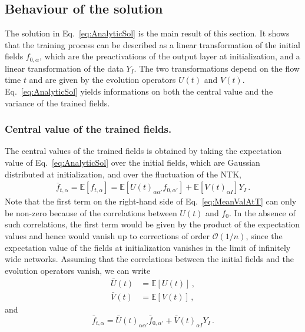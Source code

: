 \documentclass[11pt]{article}
\begin{document}
\subsection{Behaviour of the solution}
\label{sec:BehaviourOfSolution}
The solution in Eq.~\eqref{eq:AnalyticSol} is the main result of this section. It shows that the
training process can be described as a linear transformation of the initial fields $f_{0,\alpha}$,
which are the preactivations of the output layer at initialization, and a linear transformation
of the data $Y_I$. The two transformations depend on the flow time $t$ and are given by the evolution
operators $U(t)$ and $V(t)$. Eq.~\eqref{eq:AnalyticSol} yields informations on both the central value
and the variance of the trained fields.

\subsubsection{Central value of the trained fields.}
\label{sec:CentralValue}
The central values of the trained fields is obtained by taking the expectation value of
Eq.~\eqref{eq:AnalyticSol} over the initial fields, which are Gaussian distributed at initialization, and over the
fluctuation of the NTK,
\begin{align}
    \label{eq:MeanValAtT}
    \bar{f}_{t,\alpha} = \mathbb{E}\left[f_{t,\alpha}\right]
        = \mathbb{E}\left[U(t)_{\alpha\alpha'} f_{0,\alpha'}\right]
            + \mathbb{E}\left[V(t)_{\alpha I}\right] Y_I \, .
\end{align}
Note that the first term on the right-hand side of Eq.~\eqref{eq:MeanValAtT} can only be non-zero because of the
correlations between $U(t)$ and $f_0$. In the absence of such correlations, the first term would be given by the product
of the expectation values and hence would vanish up to corrections of order $\mathcal{O}(1/n)$, since the expectation
value of the fields at initialization vanishes in the limit of infinitely wide networks.
Assuming that the correlations between the initial fields and the evolution operators vanish, we can write
\begin{align}
    \label{eq:MeanUt}
    \bar{U}(t)
        &= \mathbb{E}\left[U(t)\right]\, , \\
    \label{eq:MeanVt}
    \bar{V}(t)
        &= \mathbb{E}\left[V(t)\right]\, ,
\end{align}
and
\begin{equation}
    \label{eq:MeanValAtTNoCorr}
    \bar{f}_{t,\alpha} = \bar{U}(t)_{\alpha\alpha'} \bar{f}_{0,\alpha'}
        + \bar{V}(t)_{\alpha I} Y_I\, .
\end{equation}
\end{document}
